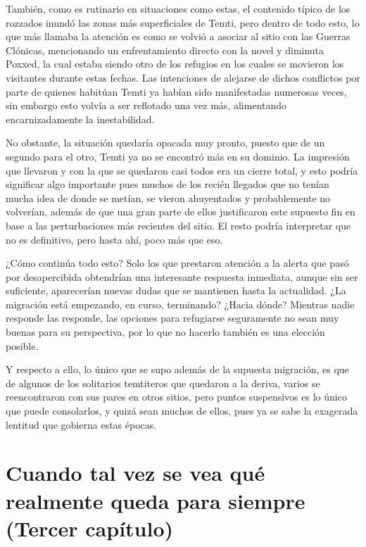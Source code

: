 \documentclass[
  spanish,
]{book}
\begin{document}
También, como es rutinario en situaciones como estas, el contenido típico de los rozzados inundó las zonas más superficiales de Temti, pero dentro de todo esto, lo que más llamaba la atención es como se volvió a asociar al sitio con las Guerras Clónicas, mencionando un enfrentamiento directo con la novel y diminuta Poxxed, la cual estaba siendo otro de los refugios en los cuales se movieron los visitantes durante estas fechas. Las intenciones de alejarse de dichos conflictos por parte de quienes habitúan Temti ya habían sido manifestadas numerosas veces, sin embargo esto volvía a ser reflotado una vez más, alimentando encarnizadamente la inestabilidad.

No obstante, la situación quedaría opacada muy pronto, puesto que de un segundo para el otro, Temti ya no se encontró más en su dominio. La impresión que llevaron y con la que se quedaron casi todos era un cierre total, y esto podría significar algo importante pues muchos de los recién llegados que no tenían mucha idea de donde se metían, se vieron ahuyentados y probablemente no volverían, además de que una gran parte de ellos justificaron este supuesto fin en base a las perturbaciones más recientes del sitio. El resto podría interpretar que no es definitivo, pero hasta ahí, poco más que eso.

¿Cómo continúa todo esto?
Solo los que prestaron atención a la alerta que pasó por desapercibida obtendrían una interesante respuesta inmediata, aunque sin ser suficiente, aparecerían nuevas dudas que se mantienen hasta la actualidad. ¿La migración está empezando, en curso, terminando? ¿Hacia dónde?
Mientras nadie responde las responde, las opciones para refugiarse seguramente no sean muy buenas para su perspectiva, por lo que no hacerlo también es una elección posible.

Y respecto a ello, lo único que se supo además de la supuesta migración, es que de algunos de los solitarios temtiteros que quedaron a la deriva, varios se reencontraron con sus pares en otros sitios, pero puntos suspensivos es lo único que puede consolarlos, y quizá sean muchos de ellos, pues ya se sabe la exagerada lentitud que gobierna estas épocas.

\hypertarget{cuando-tal-vez-se-vea-quuxe9-realmente-queda-para-siempre-tercer-capuxedtulo}{%
\chapter{Cuando tal vez se vea qué realmente queda para siempre (Tercer capítulo)}\label{cuando-tal-vez-se-vea-quuxe9-realmente-queda-para-siempre-tercer-capuxedtulo}}
\end{document}
